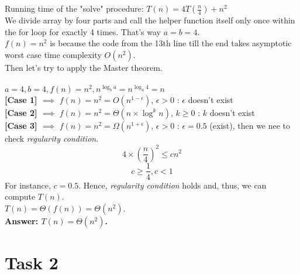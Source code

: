 \documentclass{article}
\begin{document}
\hspace{0.5cm} Running time of the "solve" procedure: \(T(n) = 4T(\frac{n}{4}) + n^2\) \\
We divide array by four parts and call the helper function itself only once within the for loop for exactly 4 times. That's way \(a = b = 4\). \\

$f(n) = n^2$ is because the code from the 13th line till the end takes asymptotic worst case time complexity $O(n^2)$. \\

Then let's try to apply the Master theorem. \\ \\
$a = 4, b = 4, f(n) = n^2, n^{\log_{b}a} = n^{\log_{4}4} = n$ \\
\textbf{[Case 1] $\implies$} $f(n) = n^2 = O(n^{1 - \epsilon})$, $\epsilon > 0$ : $\epsilon$ doesn't exist \\
\textbf{[Case 2] $\implies$} $f(n) = n^2 = \Theta(n\times \log^k{n})$, $k \geq 0$ : $k$ doesn't exist \\
\textbf{[Case 3] $\implies$} $f(n) = n^2 = \Omega(n^{1 + \epsilon})$, $\epsilon > 0$ : $\epsilon = 0.5$ (exist), then we nee to check \textit{regularity condition}. \\
\begin{equation}
    4\times (\frac{n}{4})^2 \leq cn^2
\end{equation}
\begin{equation}
    c \geq \frac{1}{4}, c < 1
\end{equation}
For instance, $c = 0.5$. Hence, \textit{regularity condition} holds and, thus, we can compute $T(n)$. \\
$T(n) = \Theta(f(n)) = \Theta(n^2)$. \\

\textbf{Answer: $T(n) = \Theta(n^2)$.}

\section{Task 2}
\end{document}
